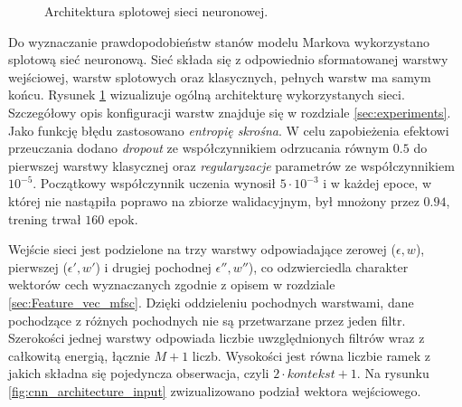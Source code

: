 \documentclass[11pt]{article}
\begin{document}
\begin{figure}[H]
		\label{fig:cnn_architecture_1}
		\caption{Architektura splotowej sieci neuronowej.}
	\end{figure}

	Do wyznaczanie prawdopodobieństw stanów modelu Markova wykorzystano splotową sieć neuronową. Sieć składa się z odpowiednio sformatowanej warstwy wejściowej, warstw splotowych oraz klasycznych, pełnych warstw ma samym końcu. Rysunek \ref{fig:cnn_architecture_1} wizualizuje ogólną architekturę wykorzystanych sieci. Szczegółowy opis konfiguracji warstw znajduje się w rozdziale \ref{sec:experiments}. Jako funkcję błędu zastosowano \textit{entropię skrośna}. W celu zapobieżenia efektowi przeuczania dodano \textit{dropout} ze współczynnikiem odrzucania równym $0.5$ do pierwszej warstwy klasycznej oraz \textit{regularyzacje} parametrów ze współczynnikiem $10^{-5}$. Początkowy współczynnik uczenia wynosił $5 \cdot 10^{-3}$ i w każdej epoce, w której nie nastąpiła poprawo na zbiorze walidacyjnym, był mnożony przez $0.94$, trening trwał $160$ epok.
	
	Wejście sieci jest podzielone na trzy warstwy odpowiadające zerowej ($\epsilon, w$), pierwszej ($\epsilon', w'$) i drugiej pochodnej $\epsilon'', w''$), co odzwierciedla charakter wektorów cech wyznaczanych zgodnie z opisem w rozdziale \ref{sec:Feature_vec_mfsc}. Dzięki oddzieleniu pochodnych warstwami, dane pochodzące z różnych pochodnych nie są przetwarzane przez jeden filtr. Szerokości jednej warstwy odpowiada liczbie uwzględnionych filtrów wraz z całkowitą energią, łącznie $M+1$ liczb. Wysokości jest równa liczbie ramek z jakich składna się pojedyncza obserwacja, czyli $2\cdot kontekst + 1$. Na rysunku \ref{fig:cnn_architecture_input} zwizualizowano podział wektora wejściowego. 
	
\end{document}
